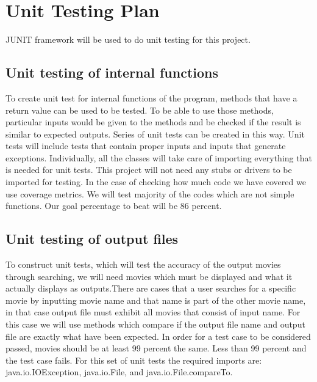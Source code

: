 \documentclass[12pt, titlepage]{article}
\begin{document}
				
\section{Unit Testing Plan}
JUNIT framework will be used to do unit testing for this project.
		
\subsection{Unit testing of internal functions}
To create unit test for internal functions of the program, methods that have a return value can be used to be tested. To be able to use those methods, particular inputs would be given to the methods and be checked if the result is similar to expected outputs. Series of unit tests can be created in this way. Unit tests will include tests that contain proper inputs and inputs that generate exceptions. Individually, all the classes will take care of importing everything that is needed for unit tests. This project will not need any stubs or drivers to be imported for testing. In the case of checking how much code we have covered we use coverage metrics. We will test majority of the codes which are not simple functions. Our goal percentage to beat will be 86 percent.
		
\subsection{Unit testing of output files}		
To construct unit tests, which will test the accuracy of the output movies through searching, we will need movies which must be displayed and what it actually displays as outputs.There are cases that a user searches for a specific movie by inputting movie name and that name is part of the other movie name, in that case output file must exhibit all movies that consist of input name. For this case we will use methods which compare if the output file name and output file are exactly what have been expected. In order for a test case to be considered passed, movies should be at least 99 percent the same. Less than 99 percent and the test case fails. For this set of unit tests the required imports are:  java.io.IOException,  java.io.File, and java.io.File.compareTo.
\end{document}
